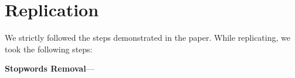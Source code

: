 \section{Replication}
We strictly followed the steps demonstrated in the paper. While replicating, we took the following steps:

\noindent\textbf{Stopwords Removal}--- 
\label{sect:replication}
